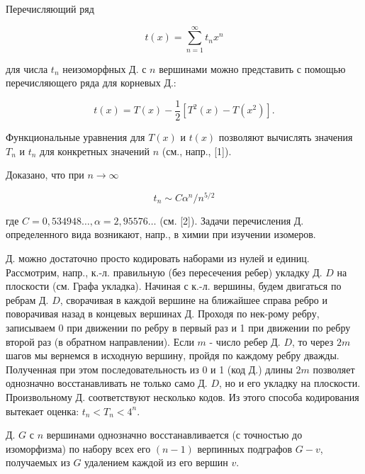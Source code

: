 \documentclass[10pt]{article}
\begin{document}
Перечисляющий ряд



\[

t(x)=\sum_{n=1}^{\infty} t_{n} x^{n}

\]



для числа $t_{n}$ неизоморфных Д. с $n$ вершинами можно представить с помощью перечисляющего ряда для корневых Д.:



\[

t(x)=T(x)-\frac{1}{2}\left[T^{2}(x)-T\left(x^{2}\right)\right] .

\]



Функциональные уравнения для $T(x)$ и $t(x)$ позволяют вычислять значения $T_{n}$ и $t_{n}$ для конкретных значений $n$ (см., напр., [1]).



Доказано, что при $n \rightarrow \infty$



\[

t_{n} \sim C \alpha^{n} / n^{5 / 2}

\]



где $C=0,534948 \ldots, \alpha=2,95576 \ldots$ (см. [2]). Задачи перечисления Д. определенного вида возникают, напр., в химии при изучении изомеров.



Д. можно достаточно просто кодировать наборами из нулей и единиц. Рассмотрим, напр., к.-л. правильную (без пересечения ребер) укладку Д. $D$ на плоскости (см. Графа укладка). Начиная с к.-л. вершины, будем двигаться по ребрам Д. $D$, сворачивая в каждой вершине на ближайшее справа ребро и поворачивая назад в концевых вершинах Д. Проходя по нек-рому ребру, записываем 0 при движении по ребру в первый раз и 1 при движении по ребру второй раз (в обратном направлении). Если $m$ - число ребер Д. $D$, то через $2 m$ шагов мы вернемся в исходную вершину, пройдя по каждому ребру дважды. Полученная при этом последовательность из 0 и 1 (код Д.) длины $2 m$ позволяет однозначно восстанавливать не только само Д. $D$, но и его укладку на плоскости. Произвольному Д. соответствуют несколько кодов. Из этого способа кодирования вытекает оценка: $t_{n}<T_{n}<4^{n}$.



Д. $G$ с $n$ вершинами однозначно восстанавливается (с точностью до изоморфизма) по набору всех его $(n-1)$ верпинных подграфов $G-v$, получаемых из $G$ удалением каждой из его вершин $v$.
\end{document}
